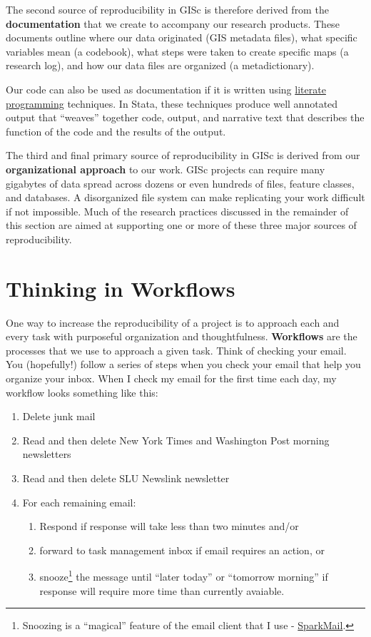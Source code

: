 \documentclass[]{book}
\providecommand{\tightlist}{%
  \setlength{\itemsep}{0pt}\setlength{\parskip}{0pt}}
\let\rmarkdownfootnote\footnote%
\def\footnote{\protect\rmarkdownfootnote}
\begin{document}
The second source of reproducibility in GISc is therefore derived from
the \textbf{documentation} that we create to accompany our research
products. These documents outline where our data originated (GIS
metadata files), what specific variables mean (a codebook), what steps
were taken to create specific maps (a research log), and how our data
files are organized (a metadictionary).

Our code can also be used as documentation if it is written using
\href{https://en.wikipedia.org/wiki/Literate_programming}{literate
programming} techniques. In Stata, these techniques produce well
annotated output that ``weaves'' together code, output, and narrative
text that describes the function of the code and the results of the
output.

The third and final primary source of reproducibility in GISc is derived
from our \textbf{organizational approach} to our work. GISc projects can
require many gigabytes of data spread across dozens or even hundreds of
files, feature classes, and databases. A disorganized file system can
make replicating your work difficult if not impossible. Much of the
research practices discussed in the remainder of this section are aimed
at supporting one or more of these three major sources of
reproducibility.

\section{Thinking in Workflows}\label{thinking-in-workflows}

One way to increase the reproducibility of a project is to approach each
and every task with purposeful organization and thoughtfulness.
\textbf{Workflows} are the processes that we use to approach a given
task. Think of checking your email. You (hopefully!) follow a series of
steps when you check your email that help you organize your inbox. When
I check my email for the first time each day, my workflow looks
something like this:

\begin{enumerate}
\def\labelenumi{\arabic{enumi}.}
\tightlist
\item
  Delete junk mail
\item
  Read and then delete New York Times and Washington Post morning
  newsletters
\item
  Read and then delete SLU Newslink newsletter
\item
  For each remaining email:

  \begin{enumerate}
  \def\labelenumii{\alph{enumii}.}
  \tightlist
  \item
    Respond if response will take less than two minutes and/or
  \item
    forward to task management inbox if email requires an action, or
  \item
    snooze\footnote{Snoozing is a ``magical'' feature of the email
      client that I use - \href{http://sparkmailapp.com}{SparkMail}.}
    the message until ``later today'' or ``tomorrow morning'' if
    response will require more time than currently avaiable.
  \end{enumerate}
\end{enumerate}
\end{document}
